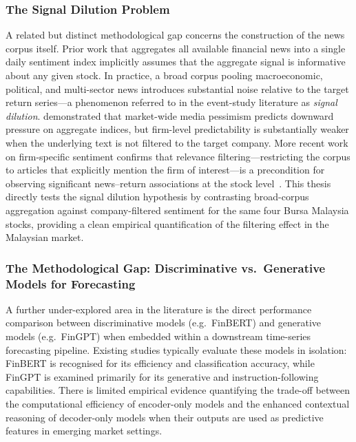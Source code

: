 \documentclass[12pt]{ucetd}
\begin{document}
\subsubsection{The Signal Dilution Problem}

A related but distinct methodological gap concerns the construction of the news corpus itself. Prior work that aggregates all available financial news into a single daily sentiment index implicitly assumes that the aggregate signal is informative about any given stock. In practice, a broad corpus pooling macroeconomic, political, and multi-sector news introduces substantial noise relative to the target return series---a phenomenon referred to in the event-study literature as \emph{signal dilution}. \citet{tetlock2007giving} demonstrated that market-wide media pessimism predicts downward pressure on aggregate indices, but firm-level predictability is substantially weaker when the underlying text is not filtered to the target company. More recent work on firm-specific sentiment confirms that relevance filtering---restricting the corpus to articles that explicitly mention the firm of interest---is a precondition for observing significant news--return associations at the stock level~\cite{tetlock2008words, cristescu2023analyzing}. This thesis directly tests the signal dilution hypothesis by contrasting broad-corpus aggregation against company-filtered sentiment for the same four Bursa Malaysia stocks, providing a clean empirical quantification of the filtering effect in the Malaysian market.

\subsubsection{The Methodological Gap: Discriminative vs.\ Generative Models for Forecasting}

A further under-explored area in the literature is the direct performance comparison between discriminative models (e.g.\ FinBERT) and generative models (e.g.\ FinGPT) when embedded within a downstream time-series forecasting pipeline. Existing studies typically evaluate these models in isolation: FinBERT is recognised for its efficiency and classification accuracy, while FinGPT is examined primarily for its generative and instruction-following capabilities. There is limited empirical evidence quantifying the trade-off between the computational efficiency of encoder-only models and the enhanced contextual reasoning of decoder-only models when their outputs are used as predictive features in emerging market settings.
\end{document}
